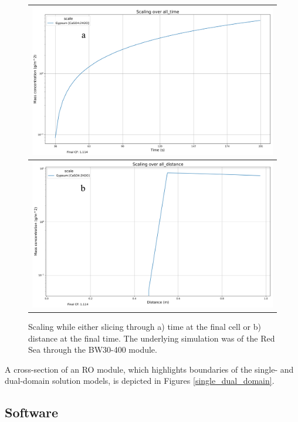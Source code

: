 \begin{supplementary}
\begin{figure}
    \centering
    \begin{tabular}{c}
        \includegraphics[width=\linewidth]{images/ROSSpy/sensitivity_analyses/simulation_perspective/all_time.png} 
        \\ \midrule
        \includegraphics[width=\linewidth]{images/ROSSpy/sensitivity_analyses/simulation_perspective/all_distance.png} 
    \end{tabular}
    \caption{
        Scaling while either slicing through a) time at the final cell or b) distance at the final time. The underlying simulation was of the Red Sea through the BW30-400 module.
    }
    \label{scaling_perspectives}
\end{figure}

A cross-section of an RO module, which highlights boundaries of the single- and dual-domain solution models, is depicted in Figures \ref{single_dual_domain}.

\subsection{Software}


\end{supplementary}
